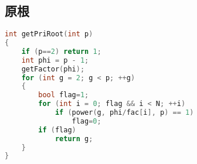 \subsection{原根}
	\begin{lstlisting}[language=c++]
int getPriRoot(int p)
{
	if (p==2) return 1;
	int phi = p - 1;
	getFactor(phi);
	for (int g = 2; g < p; ++g)
	{
		bool flag=1;
		for (int i = 0; flag && i < N; ++i)
			if (power(g, phi/fac[i], p) == 1)
				flag=0;
		if (flag)
			return g;
	}
}
	\end{lstlisting}